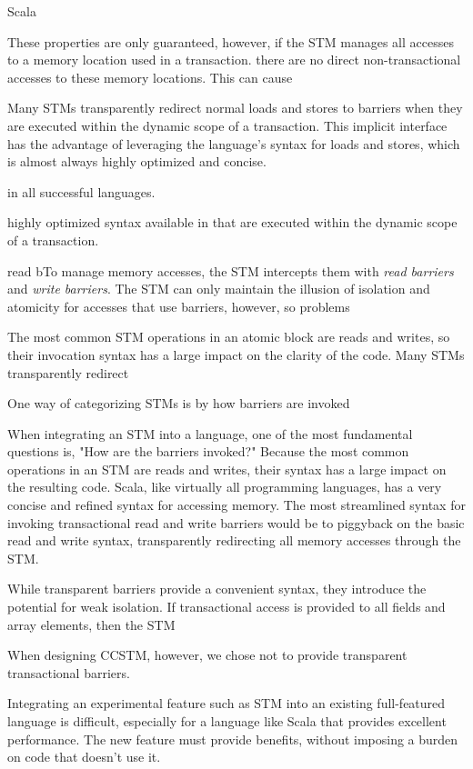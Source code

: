 Scala 

These properties are only guaranteed, however, if
the STM manages all accesses to a memory location used in a transaction.
there are no direct non-transactional accesses to these memory locations.
This can cause 

Many STMs transparently redirect normal loads
and stores to barriers when they are executed within the dynamic scope of
a transaction.  This implicit interface has the advantage of leveraging
the language's syntax for loads and stores, which is almost always highly
optimized and concise.


in all successful
languages.

highly optimized syntax
available in 
that are executed within the dynamic scope of a transaction.

read bTo manage memory accesses, the STM intercepts
them with \textit{read barriers} and \textit{write barriers}.  The STM can only
maintain the illusion of isolation and atomicity for accesses that use
barriers, however, so problems 


The
most common STM operations in an atomic block are reads and writes, so their
invocation syntax has a large impact on the clarity of the code.  Many STMs
transparently redirect 


One way of
categorizing STMs is by how barriers are invoked

When integrating an STM into a language, one of the most fundamental
questions is, "How are the barriers invoked?" Because the most common
operations in an STM are reads and writes, their syntax has a large impact
on the resulting code.  Scala, like virtually all programming languages,
has a very concise and refined syntax for accessing memory.  The most
streamlined syntax for invoking transactional read and write barriers
would be to piggyback on the basic read and write syntax, transparently
redirecting all memory accesses through the STM.

While transparent barriers provide a convenient syntax, they introduce the
potential for weak isolation.  If transactional access is provided to all
fields and array elements, then the STM 

When designing CCSTM,
however, we chose not to provide transparent transactional barriers.



Integrating an experimental feature such as STM into an existing full-featured
language is difficult, especially for a language like Scala that provides
excellent performance.  The new feature must provide benefits, without 
imposing a burden on code that doesn't use it.


